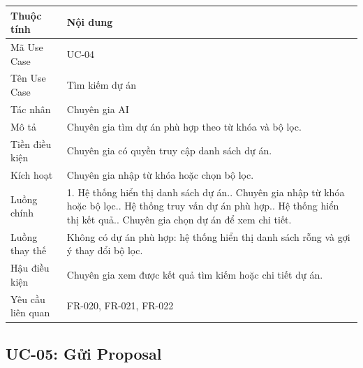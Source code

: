 \begin{longtable}{|p{3.5cm}|p{10.2cm}|}
\hline
\textbf{Thuộc tính} & \textbf{Nội dung} \\ \hline
Mã Use Case & UC-04 \\ \hline
Tên Use Case & Tìm kiếm dự án \\ \hline
Tác nhân & Chuyên gia AI \\ \hline
Mô tả & Chuyên gia tìm dự án phù hợp theo từ khóa và bộ lọc. \\ \hline
Tiền điều kiện & Chuyên gia có quyền truy cập danh sách dự án. \\ \hline
Kích hoạt & Chuyên gia nhập từ khóa hoặc chọn bộ lọc. \\ \hline
Luồng chính &
1. Hệ thống hiển thị danh sách dự án.\newline
2. Chuyên gia nhập từ khóa hoặc bộ lọc.\newline
3. Hệ thống truy vấn dự án phù hợp.\newline
4. Hệ thống hiển thị kết quả.\newline
5. Chuyên gia chọn dự án để xem chi tiết. \\ \hline
Luồng thay thế & Không có dự án phù hợp: hệ thống hiển thị danh sách rỗng và gợi ý thay đổi bộ lọc. \\ \hline
Hậu điều kiện & Chuyên gia xem được kết quả tìm kiếm hoặc chi tiết dự án. \\ \hline
Yêu cầu liên quan & FR-020, FR-021, FR-022 \\ \hline
\end{longtable}

\subsection{UC-05: Gửi Proposal}


